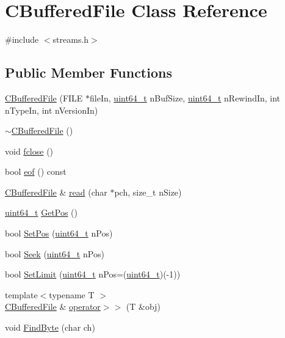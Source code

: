 \hypertarget{class_c_buffered_file}{}\section{C\+Buffered\+File Class Reference}
\label{class_c_buffered_file}


{\ttfamily \#include $<$streams.\+h$>$}

\subsection*{Public Member Functions}
\begin{DoxyCompactItemize}
\item 
\hyperlink{class_c_buffered_file_a30ad96a8d09bed60355d1fadda7dabdc}{C\+Buffered\+File} (F\+I\+L\+E $\ast$file\+In, \hyperlink{stdint_8h_aaa5d1cd013383c889537491c3cfd9aad}{uint64\+\_\+t} n\+Buf\+Size, \hyperlink{stdint_8h_aaa5d1cd013383c889537491c3cfd9aad}{uint64\+\_\+t} n\+Rewind\+In, int n\+Type\+In, int n\+Version\+In)
\item 
\hyperlink{class_c_buffered_file_a8804f689b27d3298cd5d63fbcddb97d1}{$\sim$\+C\+Buffered\+File} ()
\item 
void \hyperlink{class_c_buffered_file_aef8c993fe3eb0fa423d09d095f40dcf6}{fclose} ()
\item 
bool \hyperlink{class_c_buffered_file_abc0a2462d47ae5ba23c258291509dd6d}{eof} () const 
\item 
\hyperlink{class_c_buffered_file}{C\+Buffered\+File} \& \hyperlink{class_c_buffered_file_a20c6d2a4dbc69a8e5c7ba766d04b3d85}{read} (char $\ast$pch, size\+\_\+t n\+Size)
\item 
\hyperlink{stdint_8h_aaa5d1cd013383c889537491c3cfd9aad}{uint64\+\_\+t} \hyperlink{class_c_buffered_file_af9e7226e682ede9c1c141fb2972afd7b}{Get\+Pos} ()
\item 
bool \hyperlink{class_c_buffered_file_aac4029a9aade127cc8a1fbbcc1549599}{Set\+Pos} (\hyperlink{stdint_8h_aaa5d1cd013383c889537491c3cfd9aad}{uint64\+\_\+t} n\+Pos)
\item 
bool \hyperlink{class_c_buffered_file_afbf9abcc70f24824661aec96a4310a63}{Seek} (\hyperlink{stdint_8h_aaa5d1cd013383c889537491c3cfd9aad}{uint64\+\_\+t} n\+Pos)
\item 
bool \hyperlink{class_c_buffered_file_adfcf370a41be0454e0f6b3dc358e415c}{Set\+Limit} (\hyperlink{stdint_8h_aaa5d1cd013383c889537491c3cfd9aad}{uint64\+\_\+t} n\+Pos=(\hyperlink{stdint_8h_aaa5d1cd013383c889537491c3cfd9aad}{uint64\+\_\+t})(-\/1))
\item 
{\footnotesize template$<$typename T $>$ }\\\hyperlink{class_c_buffered_file}{C\+Buffered\+File} \& \hyperlink{class_c_buffered_file_ab570d5f1a173a41100e7b42b4aacbbc5}{operator$>$$>$} (T \&obj)
\item 
void \hyperlink{class_c_buffered_file_a15ce0683ba5925939d33f098a948236b}{Find\+Byte} (char ch)
\end{DoxyCompactItemize}
